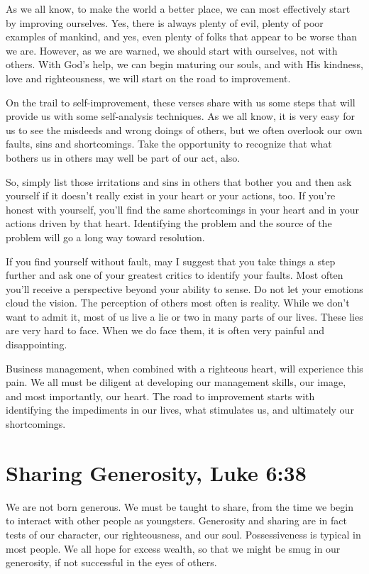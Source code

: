 \documentclass[12pt]{memoir}
\begin{document}
As we all know, to make the world a better place, we can most effectively
start by improving ourselves. Yes, there is always plenty of evil,
plenty of poor examples of mankind, and yes, even plenty of folks
that appear to be worse than we are. However, as we are warned, we
should start with ourselves, not with others. With God's help, we
can begin maturing our souls, and with His kindness, love and righteousness,
we will start on the road to improvement.

On the trail to self-improvement, these verses share with us some
steps that will provide us with some self-analysis techniques.
As we all know, it is very easy for us to see the misdeeds and wrong doings of others, but we often overlook our own faults, sins and shortcomings.
Take the opportunity to recognize that what bothers us in others may well be part of our act, also.

So, simply list those irritations
and sins in others that bother you and then ask yourself if it doesn't really exist in your heart or your actions, too. If you're
honest with yourself, you'll find the same shortcomings in your heart and in your actions driven by that heart. Identifying the problem and the source of the problem will go a long way toward resolution.

If you find yourself without fault, may I suggest that you take things
a step further and ask one of your greatest critics to identify your
faults. Most often you'll receive a perspective beyond your ability
to sense. Do not let your emotions cloud the vision. The perception
of others most often is reality. While we don't want to admit it,
most of us live a lie or two in many parts of our lives. These lies
are very hard to face. When we do face them, it is often very painful
and disappointing. 

Business management, when combined with a righteous heart, will experience
this pain. We all must be diligent at developing our management skills,
our image, and most importantly, our heart. The road to improvement starts with identifying the impediments in our lives, what stimulates
us, and ultimately our shortcomings.

\section[Sharing Generosity]{Sharing Generosity, Luke 6:38}

We are not born generous. We must be taught to share, from the time
we begin to interact with other people as youngsters. Generosity and
sharing are in fact tests of our character, our righteousness, and
our soul. Possessiveness is typical in most people. We all hope for
excess wealth, so that we might be smug in our generosity,
if not successful in the eyes of others. 
\end{document}
